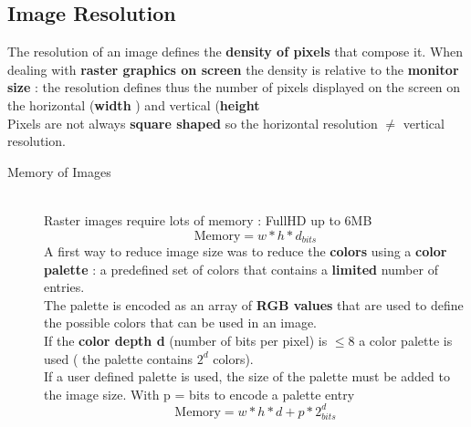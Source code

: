 \subsection{Image Resolution}
The resolution of an image defines the \textbf{density of pixels} that compose it.
When dealing with \textbf{raster graphics on screen} the density is relative to the \textbf{monitor size} : the resolution defines thus the number of pixels displayed on the screen on the horizontal (\textbf{width} ) and vertical (\textbf{height}\\
Pixels are not always \textbf{square shaped} so the horizontal resolution $ \neq$ vertical resolution.
\begin{description}
\item[Memory of Images]\hfill\\
Raster images require lots of memory : FullHD up to 6MB $$ \text{Memory} = w * h * d_ {bits} $$
A first way to reduce image size was to reduce the \textbf{colors} using a \textbf{color palette} : a predefined set of colors that contains a \textbf{limited} number of entries.\\
The palette is encoded as an array of \textbf{RGB values}	that are used to define the possible colors that can be used in an image. \\
If the \textbf{color depth d} (number of bits per pixel) is $ \leq 8 $ a color palette is used ( the palette contains $ 2^d$ colors).\\
If a user defined palette is used, the size of the palette must be added to the image size. With p = bits to encode a palette entry $$ \text{Memory} = w * h * d + p * 2_{bits}^d$$
\end{description}
	






